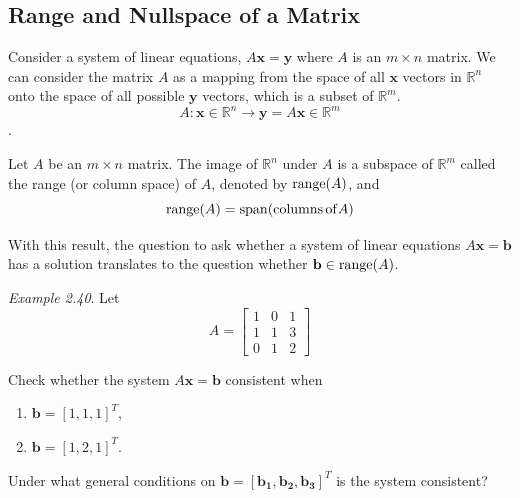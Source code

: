 \documentclass[
  letterpaper,
  DIV=11,
  numbers=noendperiod]{scrartcl}
\providecommand{\tightlist}{%
  \setlength{\itemsep}{0pt}\setlength{\parskip}{0pt}}
\theoremstyle{remark}
\newenvironment{fbxSimple}[3]{\begin{tcolorbox}[enhanced, breakable,%
attach boxed title to top*={xshift=1.4pt},
boxed title style={boxrule=0.0mm, fuzzy shadow={1pt}{-1pt}{0mm}{0.1mm}{gray}, arc=.3em, rounded corners=east, sharp corners=west}, colframe=#1-color2, colbacktitle=#1-color1, colback = white, coltitle=black,  titlerule=0mm, toprule=0pt, bottomrule=.7pt, leftrule=.3em, rightrule=.7pt, outer arc=.3em,  	left=.5em, right=.5em, bottomtitle=1mm, toptitle=1mm,title=\textbf{#2}\hspace{0.5em}{#3}]}
{\end{tcolorbox}}
\begin{document}
\subsection{Range and Nullspace of a
Matrix}\label{range-and-nullspace-of-a-matrix}

Consider a system of linear equations, \(A\mathbf{x} = \mathbf{y}\)
where \(A\) is an \(m \times n\) matrix. We can consider the matrix
\(A\) as a mapping from the space of all \(\mathbf{x}\) vectors in
\(\mathbb{R}^{n}\) onto the space of all possible \(\mathbf{y}\)
vectors, which is a subset of \(\mathbb{R}^{m}\).
\[A: \mathbf{x} \in \mathbb{R}^{n} \longrightarrow \mathbf{y} = A \mathbf{x} \in \mathbb{R}^{m}\].

\label{range}
\begin{fbxSimple}{Corollary}{Corollary 15: }{Range}
\label{range}
Let \(A\) be an \(m \times n\) matrix. The image of \(\mathbb{R}^{n}\)
under \(A\) is a subspace of \(\mathbb{R}^{m}\) called the range (or
column space) of \(A\), denoted by \({\rm range}(A)\), and
\[ {\rm range}(A) = {\rm span}({\rm columns \, of } A)\]

\end{fbxSimple}

With this result, the question to ask whether a system of linear
equations \(A\mathbf{x} = \mathbf{b}\) has a solution translates to the
question whether \(\mathbf{b} \in {\rm range}(A)\).

\emph{Example 2.40}. Let \[A = \left[\begin{array}{ccc}
            1 & 0 & 1 \\
            1 & 1 & 3 \\
            0 & 1 & 2
        \end{array}\right]\]

Check whether the system \(A\mathbf{x} = \mathbf{b}\) consistent when

\begin{enumerate}
\def\labelenumi{(\roman{enumi})}
\tightlist
\item
  \(\mathbf{b} = \left[1,1,1\right]^T\),
\item
  \(\mathbf{b} = \left[1,2,1\right]^T\).
\end{enumerate}

Under what general conditions on
\(\mathbf{b} = \left[\mathbf{b_1},\mathbf{b_2},\mathbf{b_3}\right]^T\)
is the system consistent?
\end{document}
